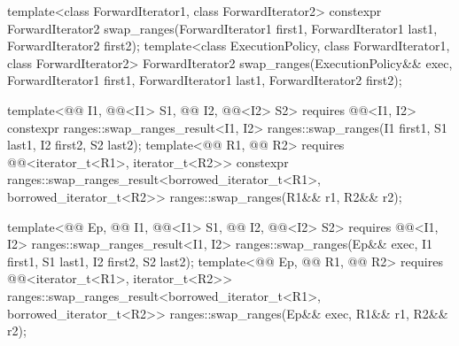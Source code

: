 %
\begin{itemdecl}
template<class ForwardIterator1, class ForwardIterator2>
  constexpr ForwardIterator2
    swap_ranges(ForwardIterator1 first1, ForwardIterator1 last1,
                ForwardIterator2 first2);
template<class ExecutionPolicy, class ForwardIterator1, class ForwardIterator2>
  ForwardIterator2
    swap_ranges(ExecutionPolicy&& exec,
                ForwardIterator1 first1, ForwardIterator1 last1,
                ForwardIterator2 first2);

template<@@ I1, @@<I1> S1, @@ I2, @@<I2> S2>
  requires @@<I1, I2>
  constexpr ranges::swap_ranges_result<I1, I2>
    ranges::swap_ranges(I1 first1, S1 last1, I2 first2, S2 last2);
template<@@ R1, @@ R2>
  requires @@<iterator_t<R1>, iterator_t<R2>>
  constexpr ranges::swap_ranges_result<borrowed_iterator_t<R1>, borrowed_iterator_t<R2>>
    ranges::swap_ranges(R1&& r1, R2&& r2);

template<@@ Ep, @@ I1, @@<I1> S1,
         @@ I2, @@<I2> S2>
  requires @@<I1, I2>
  ranges::swap_ranges_result<I1, I2>
    ranges::swap_ranges(Ep&& exec, I1 first1, S1 last1, I2 first2, S2 last2);
template<@@ Ep, @@ R1, @@ R2>
  requires @@<iterator_t<R1>, iterator_t<R2>>
  ranges::swap_ranges_result<borrowed_iterator_t<R1>, borrowed_iterator_t<R2>>
    ranges::swap_ranges(Ep&& exec, R1&& r1, R2&& r2);
\end{itemdecl}

